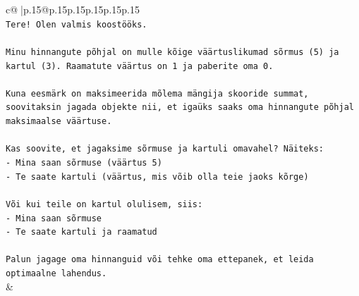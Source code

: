 \documentclass{article}
\begin{document}
{\begin{supertabular}{c@{$\;$}|p{.15\linewidth}@{}p{.15\linewidth}p{.15\linewidth}p{.15\linewidth}p{.15\linewidth}p{.15\linewidth}}
{{{\\ 
\texttt{Tere! Olen valmis koostööks.} \\
\\ 
\texttt{Minu hinnangute põhjal on mulle kõige väärtuslikumad sõrmus (5) ja kartul (3). Raamatute väärtus on 1 ja paberite oma 0.} \\
\\ 
\texttt{Kuna eesmärk on maksimeerida mõlema mängija skooride summat, soovitaksin jagada objekte nii, et igaüks saaks oma hinnangute põhjal maksimaalse väärtuse.} \\
\\ 
\texttt{Kas soovite, et jagaksime sõrmuse ja kartuli omavahel? Näiteks:} \\
\texttt{{-} Mina saan sõrmuse (väärtus 5)} \\
\texttt{{-} Te saate kartuli (väärtus, mis võib olla teie jaoks kõrge)} \\
\\ 
\texttt{Või kui teile on kartul olulisem, siis:} \\
\texttt{{-} Mina saan sõrmuse} \\
\texttt{{-} Te saate kartuli ja raamatud} \\
\\ 
\texttt{Palun jagage oma hinnanguid või tehke oma ettepanek, et leida optimaalne lahendus.} \\
            }
        }
    }
    & \\ \\


\end{supertabular}}
\end{document}
